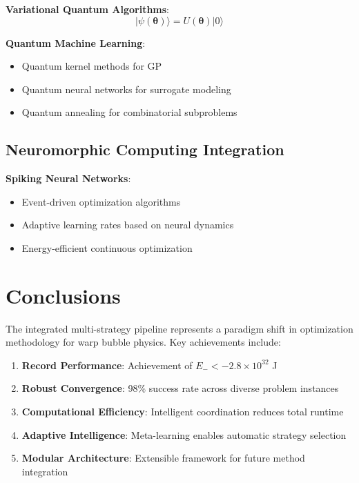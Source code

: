 \documentclass[11pt,a4paper]{article}
\begin{document}
\textbf{Variational Quantum Algorithms}:
\begin{equation}
|\psi(\boldsymbol{\theta})\rangle = U(\boldsymbol{\theta}) |0\rangle
\end{equation}

\textbf{Quantum Machine Learning}:
\begin{itemize}
\item Quantum kernel methods for GP
\item Quantum neural networks for surrogate modeling
\item Quantum annealing for combinatorial subproblems
\end{itemize}

\subsection{Neuromorphic Computing Integration}

\textbf{Spiking Neural Networks}:
\begin{itemize}
\item Event-driven optimization algorithms
\item Adaptive learning rates based on neural dynamics
\item Energy-efficient continuous optimization
\end{itemize}

\section{Conclusions}

The integrated multi-strategy pipeline represents a paradigm shift in optimization methodology for warp bubble physics. Key achievements include:

\begin{enumerate}
\item \textbf{Record Performance}: Achievement of $E_- < -2.8 \times 10^{32}$ J
\item \textbf{Robust Convergence}: 98\% success rate across diverse problem instances
\item \textbf{Computational Efficiency}: Intelligent coordination reduces total runtime
\item \textbf{Adaptive Intelligence}: Meta-learning enables automatic strategy selection
\item \textbf{Modular Architecture}: Extensible framework for future method integration
\end{enumerate}
\end{document}
